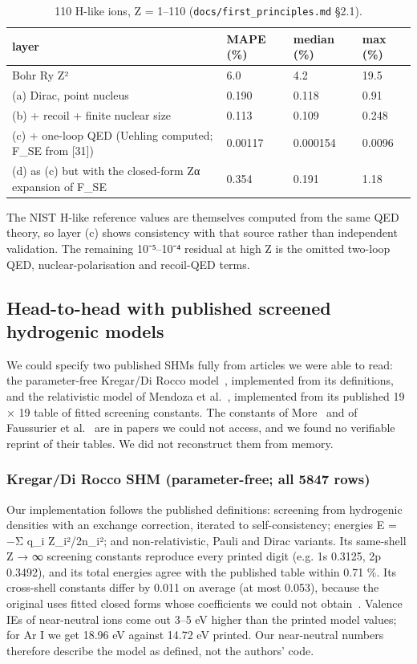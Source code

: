 \documentclass[aps,pra,preprint,superscriptaddress,amsmath,amssymb]{revtex4-2}
\begin{document}
\begin{table}[htbp]
\caption{110 H-like ions, Z = 1–110 (\texttt{docs/first\_principles.md} §2.1).}
\footnotesize
\begin{ruledtabular}
\begin{tabular}{llll}
layer & MAPE (\%) & median (\%) & max (\%) \\
\hline
Bohr Ry Z² & 6.0 & 4.2 & 19.5 \\
(a) Dirac, point nucleus & 0.190 & 0.118 & 0.91 \\
(b) + recoil + finite nuclear size & 0.113 & 0.109 & 0.248 \\
(c) + one-loop QED (Uehling computed; F\_SE from [31]) & 0.00117 & 0.000154 & 0.0096 \\
(d) as (c) but with the closed-form Zα expansion of F\_SE & 0.354 & 0.191 & 1.18 \\
\end{tabular}
\end{ruledtabular}
\end{table}


The NIST H-like reference values are themselves computed from the same QED theory, so layer (c) shows consistency with that source rather than independent validation. The remaining 10⁻⁵–10⁻⁴ residual at high Z is the omitted two-loop QED, nuclear-polarisation and recoil-QED terms.


\subsection{Head-to-head with published screened hydrogenic models}

We could specify two published SHMs fully from articles we were able to read: the parameter-free Kregar/Di Rocco model~\cite{r20,r22}, implemented from its definitions, and the relativistic model of Mendoza et al.~\cite{r16}, implemented from its published 19 × 19 table of fitted screening constants. The constants of More~\cite{r11} and of Faussurier et al.~\cite{r12} are in papers we could not access, and we found no verifiable reprint of their tables. We did not reconstruct them from memory.


\subsubsection{Kregar/Di Rocco SHM (parameter-free; all 5847 rows)}

Our implementation follows the published definitions: screening from hydrogenic densities with an exchange correction, iterated to self-consistency; energies E = −Σ q\_i Z\_i²/2n\_i²; and non-relativistic, Pauli and Dirac variants. Its same-shell Z → ∞ screening constants reproduce every printed digit (e.g. 1s 0.3125, 2p 0.3492), and its total energies agree with the published table within 0.71 \%. Its cross-shell constants differ by 0.011 on average (at most 0.053), because the original uses fitted closed forms whose coefficients we could not obtain~\cite{r19}. Valence IEs of near-neutral ions come out 3–5 eV higher than the printed model values; for Ar I we get 18.96 eV against 14.72 eV printed. Our near-neutral numbers therefore describe the model as defined, not the authors' code.
\end{document}
